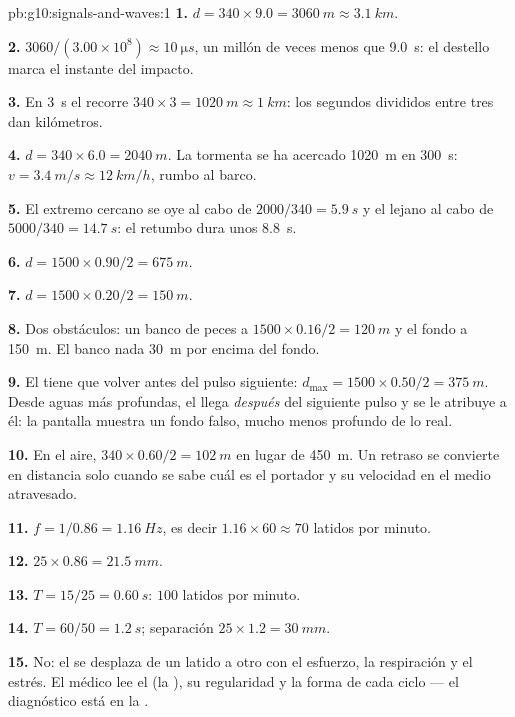 \begin{solution}{pb:g10:signals-and-waves:1}
\textbf{1.} $d = 340 \times 9.0 = \qty{3060}{m} \approx \qty{3.1}{km}$.

\textbf{2.} $3060/(3.00\times10^{8}) \approx \qty{10}{\micro s}$, un
millón de veces menos que \qty{9.0}{s}: el destello marca el instante
del impacto.

\textbf{3.} En \qty{3}{s} el  recorre
$340 \times 3 = \qty{1020}{m} \approx \qty{1}{km}$: los segundos
divididos entre tres dan kilómetros.

\textbf{4.} $d = 340 \times 6.0 = \qty{2040}{m}$. La tormenta se ha
acercado \qty{1020}{m} en \qty{300}{s}:
$v = \qty{3.4}{m/s} \approx \qty{12}{km/h}$, rumbo al barco.

\textbf{5.} El extremo cercano se oye al cabo de
$2000/340 = \qty{5.9}{s}$ y el lejano al cabo de
$5000/340 = \qty{14.7}{s}$: el retumbo dura unos \qty{8.8}{s}.

\textbf{6.} $d = 1500 \times 0.90/2 = \qty{675}{m}$.

\textbf{7.} $d = 1500 \times 0.20/2 = \qty{150}{m}$.

\textbf{8.} Dos obstáculos: un banco de peces a
$1500 \times 0.16/2 = \qty{120}{m}$ y el fondo a \qty{150}{m}. El banco
nada \qty{30}{m} por encima del fondo.

\textbf{9.} El  tiene que volver antes del pulso siguiente:
$d_{\max} = 1500 \times 0.50/2 = \qty{375}{m}$. Desde aguas más
profundas, el  llega \emph{después} del siguiente pulso y se le
atribuye a él: la pantalla muestra un fondo falso, mucho menos profundo
de lo real.

\textbf{10.} En el aire, $340 \times 0.60/2 = \qty{102}{m}$ en lugar de
\qty{450}{m}. Un retraso se convierte en distancia solo cuando se sabe
cuál es el portador y su velocidad en el medio atravesado.

\textbf{11.} $f = 1/0.86 = \qty{1.16}{Hz}$, es decir
$1.16 \times 60 \approx 70$ latidos por minuto.

\textbf{12.} $25 \times 0.86 = \qty{21.5}{mm}$.

\textbf{13.} $T = 15/25 = \qty{0.60}{s}$: $100$ latidos por minuto.

\textbf{14.} $T = 60/50 = \qty{1.2}{s}$; separación
$25 \times 1.2 = \qty{30}{mm}$.

\textbf{15.} No: el  se desplaza de un latido a otro con el
esfuerzo, la respiración y el estrés. El médico lee el  (la
), su regularidad y la forma de cada ciclo --- el diagnóstico
está en la .


\end{solution}
